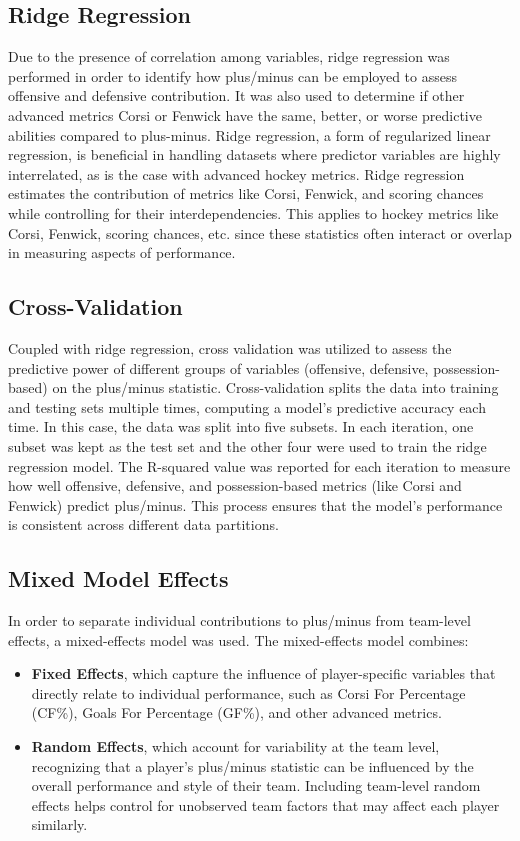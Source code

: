 \documentclass[12pt]{article}
\begin{document}
\subsection{Ridge Regression}

Due to the presence of correlation among variables, ridge regression was performed in order to identify how plus/minus can be employed 
to assess offensive and defensive contribution. It was also used to determine if other advanced metrics Corsi or Fenwick have the same, 
better, or worse predictive abilities compared to plus-minus. Ridge regression, a form of regularized linear regression, is beneficial 
in handling datasets where predictor variables are highly interrelated, as is the case with advanced hockey metrics. Ridge regression 
estimates the contribution of metrics like Corsi, Fenwick, and scoring chances while controlling for their interdependencies. This 
applies to hockey metrics like Corsi, Fenwick, scoring chances, etc. since these statistics often interact or overlap in measuring aspects 
of performance.

\subsection{Cross-Validation}

Coupled with ridge regression, cross validation was utilized to assess the predictive power of different groups of variables (offensive, 
defensive, possession-based) on the plus/minus statistic. Cross-validation splits the data into training and testing sets multiple times, 
computing a model's predictive accuracy each time. In this case, the data was split into five subsets. In each iteration, one subset was
kept as the test set and the other four were used to train the ridge regression model. The R-squared value was reported for each iteration
to measure how well offensive, defensive, and possession-based metrics (like Corsi and Fenwick) predict plus/minus. This process ensures 
that the model’s performance is consistent across different data partitions.

\subsection{Mixed Model Effects}

In order to separate individual contributions to plus/minus from team-level effects, a mixed-effects model was used. 
The mixed-effects model combines:
\begin{itemize}
    \item \textbf{Fixed Effects}, which capture the influence of player-specific variables that directly relate to individual performance, 
    such as Corsi For Percentage (CF\%), Goals For Percentage (GF\%), and other advanced metrics.
    \item \textbf{Random Effects}, which account for variability at the team level, recognizing that a player’s plus/minus statistic can be 
    influenced by the overall performance and style of their team. Including team-level random effects helps control for unobserved team 
    factors that may affect each player similarly.
\end{itemize}
\end{document}
